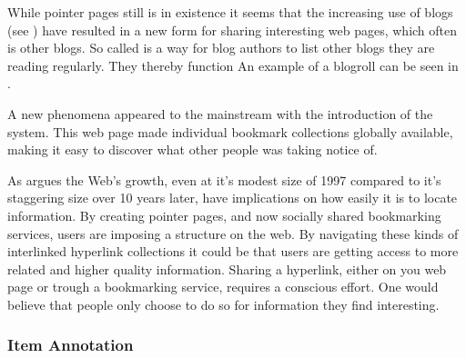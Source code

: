 While pointer pages still is in existence it seems that the increasing
use of blogs (see )
have resulted in a new form for sharing interesting web pages,
which often is other blogs. So called  is a way for blog
authors to list other blogs they are reading regularly. They thereby function
An example of a blogroll can be seen in .

A new phenomena appeared to the mainstream with the introduction of the
 system. This web page made individual
bookmark collections globally available, making it easy to discover what other
people was taking notice of.


As \citet[]{dieberger97} argues the Web's growth, even at it's modest
size of 1997 compared to it's staggering size over 10 years later, have
implications on how easily it is to locate information. By creating pointer
pages, and now socially shared bookmarking services, users are imposing a
structure on the web. By navigating these kinds of interlinked hyperlink
collections it could be that users are getting access to more related and
higher quality information. Sharing a hyperlink, either on you web page or
trough a bookmarking service, requires a conscious effort. One would believe
that people only choose to do so for information they find interesting.

\subsubsection{Item Annotation}

